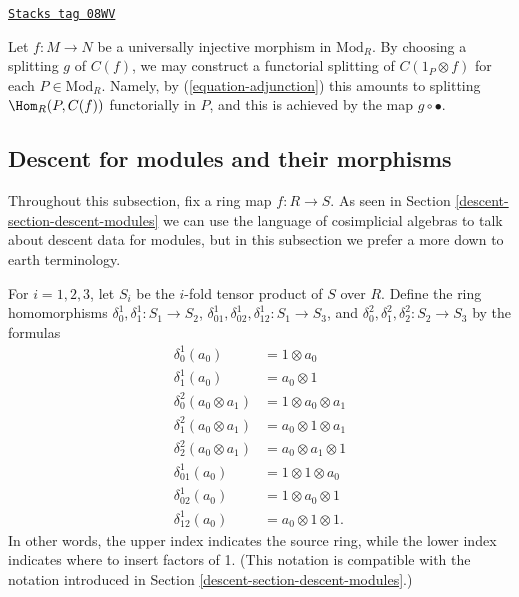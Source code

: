\begin{remark}
\label{descent-remark-functorial-splitting}
\href{https://stacks.math.columbia.edu/tag/08WV}{\texttt{Stacks tag 08WV}}

Let $f: M \to N$ be a universally injective morphism in $\text{Mod}_R$. By
choosing a splitting
$g$ of $C(f)$, we may construct a functorial splitting of $C(1_P \otimes f)$
for each $P \in \text{Mod}_R$.
Namely, by (\ref{equation-adjunction}) this amounts to splitting $\Hom_R(P,
C(f))$  functorially in $P$,
and this is achieved by the map $g \circ \bullet$.
\end{remark}


\subsection{Descent for modules and their morphisms}
\label{descent-subsection-descent-modules-morphisms}

Throughout this subsection, fix a ring map $f: R \to S$. As seen in
Section \ref{descent-section-descent-modules} we can use the language of cosimplicial
algebras to talk about descent data for modules, but in this
subsection we prefer a more down to earth terminology.

\medskip\noindent
For $i = 1, 2, 3$, let $S_i$ be the $i$-fold tensor product of $S$ over $R$.
Define the ring homomorphisms $\delta_0^1, \delta_1^1: S_1 \to S_2$,
$\delta_{01}^1, \delta_{02}^1, \delta_{12}^1: S_1 \to S_3$, and
$\delta_0^2, \delta_1^2, \delta_2^2: S_2 \to S_3$ by the formulas
\begin{align*}
\delta^1_0  (a_0) & =  1 \otimes a_0 \\
\delta^1_1  (a_0) & = a_0 \otimes 1 \\
\delta^2_0  (a_0 \otimes a_1) & =  1 \otimes a_0 \otimes a_1 \\
\delta^2_1  (a_0 \otimes a_1) & =  a_0 \otimes 1 \otimes a_1 \\
\delta^2_2  (a_0 \otimes a_1) & =  a_0 \otimes a_1 \otimes 1 \\
\delta_{01}^1(a_0) & = 1 \otimes 1 \otimes a_0 \\
\delta_{02}^1(a_0) & = 1 \otimes a_0 \otimes 1 \\
\delta_{12}^1(a_0) & = a_0 \otimes 1 \otimes 1.
\end{align*}
In other words, the upper index indicates the source ring, while the lower
index indicates where to insert factors of 1. (This notation is compatible
with the notation introduced in Section \ref{descent-section-descent-modules}.)

